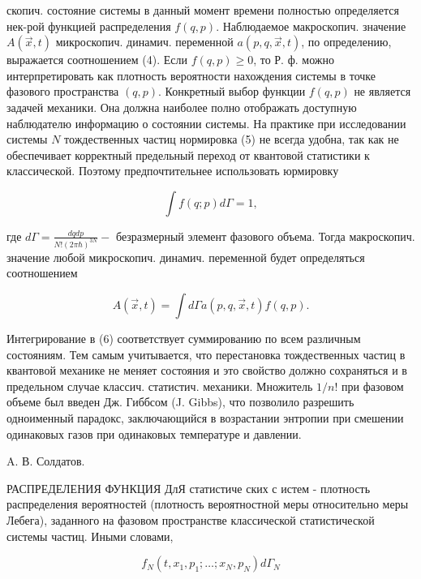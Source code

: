 \documentclass[10pt]{article}
\begin{document}
скопич. состояние системы в данный момент времени полностью определяется нек-рой функцией распределения $f(q, p)$. Наблюдаемое макроскопич. значение $A(\vec{x}, t)$ микроскопич. динамич. переменной $a(p, q, \vec{x}, t)$, по определению, выражается соотношением (4). Если $f(q, p) \geqslant 0$, то Р. ф. можно интерпретировать как плотность вероятности нахождения системы в точке фазового пространства $(q, p)$. Конкретный выбор функции $f(q, p)$ не является задачей механики. Она должна наиболее полно отображать доступную наблюдателю информацию о состоянии системы. На практике при исследовании системы $N$ тождественных частиц нормировка (5) не всегда удобна, так как не обеспечивает корректный предельный переход от квантовой статистики к классической. Поэтому предпочтительнее использовать юрмировку



\[

\int f(q ; p) d \Gamma=1,

\]



где $d \Gamma=\frac{d q d p}{N !(2 \pi \hbar)^{3 N}}-$ безразмерный элемент фазового объема. Тогда макроскопич. значение любой микроскопич. динамич. переменной будет определяться соотношением



\[

A(\vec{x}, t)=\int d \Gamma a(p, q, \vec{x}, t) f(q, p) .

\]



Интегрирование в (6) соответствует суммированию по всем различным состояниям. Тем самым учитывается, что перестановка тождественных частиц в квантовой механике не меняет состояния и это свойство должно сохраняться и в предельном случае классич. статистич. механики. Множитель $1 / n !$ при фазовом объеме был введен Дж. Гиббсом (J. Gibbs), что позволило разрешить одноименный парадокс, заключающийся в возрастании энтропии при смешении одинаковых газов при одинаковых температуре и давлении.



A. В. Солдатов.



РАСПРЕДЕЛЕНИЯ ФУНКЦИЯ ДлЯ статистиче ских с истем - плотность распределения вероятностей (плотность вероятностной меры относительно меры Лебега), заданного на фазовом пространстве классической статистической системы частиц. Иными словами,



\[

f_{N}\left(t, x_{1}, p_{1} ; \ldots ; x_{N}, p_{N}\right) d \Gamma_{N}

\]
\end{document}
